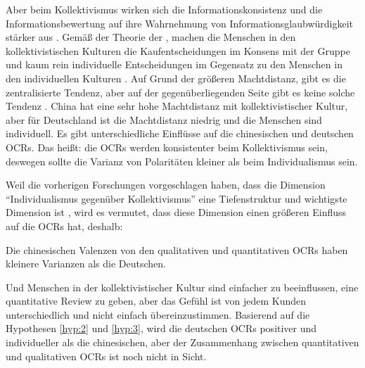 Aber beim Kollektivismus wirken sich die Informationskonsistenz und die Informationsbewertung auf ihre Wahrnehmung von Informationsglaubwürdigkeit stärker aus \citep{Luo2014}. Gemäß der Theorie der \citet{hofstede1998masculinity}, machen die Menschen in den kollektivistischen Kulturen die Kaufentscheidungen im Konsens mit der Gruppe und kaum rein individuelle Entscheidungen im Gegensatz zu den Menschen in den individuellen Kulturen \citep{singelis1994measurement}. Auf Grund der größeren Machtdistanz, gibt es die zentralisierte Tendenz, aber auf der gegenüberliegenden Seite gibt es keine solche Tendenz \citep{hofstede2013interkulturelle}. China hat eine sehr hohe Machtdistanz mit kollektivistischer Kultur, aber für Deutschland ist die Machtdistanz niedrig und die Menschen sind individuell. Es gibt unterschiedliche Einflüsse auf die chinesischen und deutschen \ac{OCRs}. Das heißt: die \ac{OCRs} werden konsistenter beim Kollektivismus sein, deswegen sollte die Varianz von Polaritäten kleiner als beim Individualismus sein.

Weil die vorherigen Forschungen vorgeschlagen haben, dass die Dimension ``Individualismus gegenüber Kollektivismus'' eine Tiefenstruktur und wichtigste Dimension ist \citep{grennfield2000approaches,sia2009web, triandis2001individualism}, wird es vermutet, dass diese Dimension einen größeren Einfluss auf die \ac{OCRs} hat, deshalb:
\begin{hyp} 
Die chinesischen Valenzen von den qualitativen und quantitativen \acl{OCRs} haben kleinere Varianzen als die Deutschen.
\label{hyp:3}
\end{hyp}


Und Menschen in der kollektivistischer Kultur sind einfacher zu beeinflussen, eine quantitative Review zu geben, aber das Gefühl ist von jedem Kunden unterschiedlich und nicht einfach übereinzustimmen. Basierend auf die Hypothesen \ref{hyp:2} und \ref{hyp:3}, wird die deutschen \ac{OCRs} positiver und individueller als die chinesischen, aber der Zusammenhang zwischen quantitativen und qualitativen \ac{OCRs} ist noch nicht in Sicht. 

